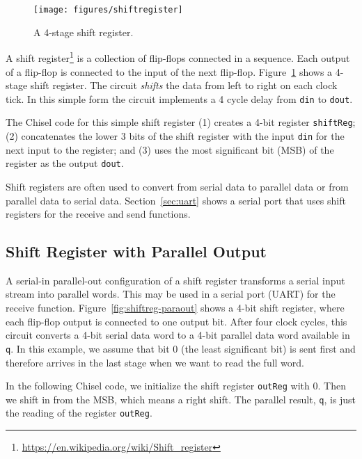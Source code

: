 \documentclass[%
    10pt,
    headinclude, footexclude,
    openright, %
    notitlepage,
    cleardoubleempty,
    headsepline,
    pointlessnumbers,
    bibtotoc, idxtotoc,
    ]{scrbook}
\newcommand{\scale}{0.7}
\newcommand{\code}[1]{{\lstinline[basicstyle=\small\ttfamily]{#1}}}
\newcommand{\myref}[2]{\href{#1}{#2}}
\renewcommand{\myref}[2]{{#2}{\footnote{\url{#1}}}}
\begin{document}
\begin{figure}
  \centering
  \texttt{[image: figures/shiftregister]}
  \caption{A 4-stage shift register.}
  \label{fig:shiftregister}
\end{figure}


A \myref{https://en.wikipedia.org/wiki/Shift_register}{shift register} is a collection of flip-flops
connected in a sequence. Each output of a flip-flop is connected to the input of the
next flip-flop. Figure~\ref{fig:shiftregister} shows a 4-stage shift register.
The circuit \emph{shifts} the data from left to right on each clock tick. In this simple form the
circuit implements a 4 cycle delay from \code{din} to \code{dout}.

The Chisel code for this simple shift register (1) creates a 4-bit register \code{shiftReg};
(2) concatenates the lower 3 bits of the shift register with the input \code{din} for the next
input to the register; and (3) uses the most significant bit (MSB) of the register as the output \code{dout}.


Shift registers are often used to convert from serial data to parallel data or from parallel data
to serial data. Section~\ref{sec:uart} shows a serial port that uses shift registers for the receive and
send functions.

\subsection{Shift Register with Parallel Output}

A serial-in parallel-out configuration of a shift register transforms a serial input stream into parallel
words. This may be used in a serial port (UART) for the receive function.
Figure~\ref{fig:shiftreg-paraout} shows a 4-bit shift register, where each flip-flop output
is connected to one output bit. After four clock cycles, this circuit converts a 4-bit serial data word
to a 4-bit parallel data word available in \code{q}. In this example, we assume that bit 0
(the least significant bit) is sent first and therefore arrives in the last stage when we want to read
the full word.

In the following Chisel code, we initialize the shift register \code{outReg} with 0. Then we shift in from the
MSB, which means a right shift. The parallel result, \code{q}, is just the reading of the register
\code{outReg}.

\end{document}
